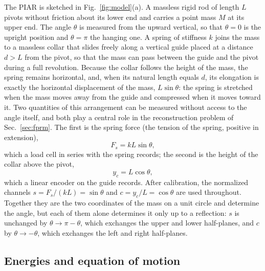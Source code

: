 The PIAR is sketched in Fig.~\ref{fig:model}(a). A massless rigid rod of length $L$ pivots without friction about its lower end and carries a point mass $M$ at its upper end. The angle $\theta$ is measured from the upward vertical, so that $\theta=0$ is the upright position and $\theta=\pi$ the hanging one. A spring of stiffness $k$ joins the mass to a massless collar that slides freely along a vertical guide placed at a distance $d>L$ from the pivot, so that the mass can pass between the guide and the pivot during a full revolution. Because the collar follows the height of the mass, the spring remains horizontal, and, when its natural length equals $d$, its elongation is exactly the horizontal displacement of the mass, $L\sin\theta$: the spring is stretched when the mass moves away from the guide and compressed when it moves toward it. Two quantities of this arrangement can be measured without access to the angle itself, and both play a central role in the reconstruction problem of Sec.~\ref{sec:fprm}. The first is the spring force (the tension of the spring, positive in extension),
\begin{equation}
F_s = kL\sin\theta ,
\label{eq:Fs}
\end{equation}
which a load cell in series with the spring records; the second is the height of the collar above the pivot,
\begin{equation}
y_c = L\cos\theta ,
\label{eq:yc}
\end{equation}
which a linear encoder on the guide records. After calibration, the normalized channels $s=F_s/(kL)=\sin\theta$ and $c=y_c/L=\cos\theta$ are used throughout. Together they are the two coordinates of the mass on a unit circle and determine the angle, but each of them alone determines it only up to a reflection: $s$ is unchanged by $\theta\to\pi-\theta$, which exchanges the upper and lower half-planes, and $c$ by $\theta\to-\theta$, which exchanges the left and right half-planes.

\subsection{Energies and equation of motion}\label{sec:lagrangian}

